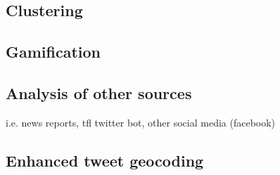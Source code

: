 \subsection{Clustering}

\subsection{Gamification}

\subsection{Analysis of other sources}
i.e. news reports, tfl twitter bot, other social media (facebook)

\subsection{Enhanced tweet geocoding}
